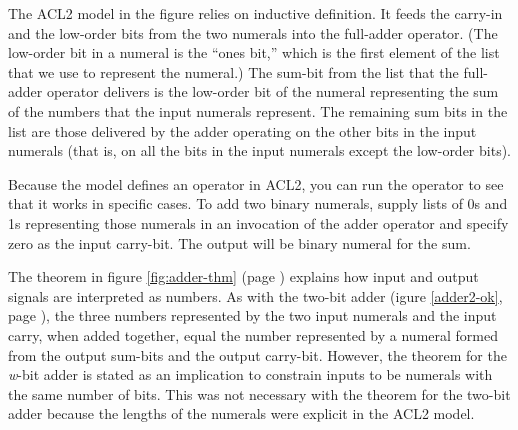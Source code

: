 The ACL2 model in the figure relies
on inductive definition. It feeds the carry-in and
the low-order bits from the two numerals into the \textsf{full-adder} operator.
(The low-order bit in a numeral is the ``ones bit,''
which is the first element of the list that we use to
represent the numeral.)
The sum-bit from the list that the \textsf{full-adder} operator delivers
is the low-order bit of the numeral representing the sum of
the numbers that the input numerals represent.
The remaining sum bits in the list are those delivered by
the \textsf{adder} operating on the other bits in the input numerals
(that is, on all the bits in the input numerals except the low-order bits).

Because the model defines an operator in ACL2,
you can run the operator to see that it works in specific cases.
To add two binary numerals, supply lists of
0s and 1s
representing those numerals in an invocation
of the \textsf{adder} operator and specify zero as the input carry-bit.
The output will be binary numeral for the sum.

The theorem in figure \ref{fig:adder-thm} (page \pageref{fig:adder-thm})
explains how input and output signals are interpreted as numbers.
As with the two-bit adder (igure \ref{adder2-ok}, page \pageref{adder2-ok}),
the three numbers represented by the two input
numerals and the input carry, when added together,
equal the number represented
by a numeral formed from the output sum-bits and
the output carry-bit.
However, the theorem for the \emph{w}-bit adder
is stated as an implication to constrain
inputs to be numerals with the same number of bits.
This was not necessary with the theorem for the two-bit adder
because the lengths of the numerals were explicit in the ACL2 model.

